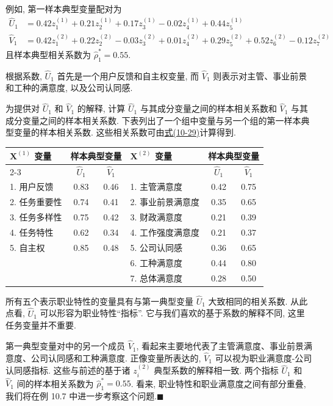 
例如, 第一样本典型变量配对为
\[
\begin{aligned}
\hat{U}_1&=0.42z_1^{(1)}+0.21z_2^{(1)}+0.17z_3^{(1)}-0.02z_4^{(1)}+0.44z_5^{(1)}\\
\hat{V}_1&=0.42z_1^{(2)}+0.22z_2^{(2)}-0.03z_3^{(2)}+0.01z_4^{(2)}+0.29z_5^{(2)}+0.52z_6^{(2)}-0.12z_7^{(2)}
\end{aligned}
\]
且样本典型相关系数为 $\hat{\rho}_1^*=0.55$.

根据系数, $\hat{U}_1$ 首先是一个用户反馈和自主权变量, 而 $\hat{V}_1$ 则表示对主管、事业前景和工种的满意度, 以及公司认同感.

为提供对 $\hat{U}_1$ 和 $\hat{V}_1$ 的解释, 计算 $\hat{U}_1$ 与其成分变量之间的样本相关系数和 $\hat{V}_1$ 与其成分变量之间的样本相关系数. 下表列出了一个组中变量与另一个组的第一样本典型变量的样本相关系数. 这些相关系数可由\hyperref[eq:10-29]{式(10-29)}计算得到.

\begin{mvtable}
\begin{tabular}{l|cc|l|cc}
\hline
\multirow{2}{*}{$\mathbf{X}^{(1)}$ 变量} & \multicolumn{2}{c|}{样本典型变量} & \multirow{2}{*}{$\mathbf{X}^{(2)}$ 变量} & \multicolumn{2}{c}{样本典型变量}\\
\cline{2-3}\cline{5-6}
& $\hat{U}_1$ & $\hat{V}_1$ & & $\hat{U}_1$ & $\hat{V}_1$\\
\hline
1. 用户反馈 & 0.83 & 0.46 & 1. 主管满意度 & 0.42 & 0.75\\
2. 任务重要性 & 0.74 & 0.41 & 2. 事业前景满意度 & 0.35 & 0.65\\
3. 任务多样性 & 0.75 & 0.42 & 3. 财政满意度 & 0.21 & 0.39\\
4. 任务特性 & 0.62 & 0.34 & 4. 工作强度满意度 & 0.21 & 0.37\\
5. 自主权 & 0.85 & 0.48 & 5. 公司认同感 & 0.36 & 0.65\\
& & & 6. 工种满意度 & 0.44 & 0.80\\
& & & 7. 总体满意度 & 0.28 & 0.50\\
\hline
\end{tabular}
\end{mvtable}

所有五个表示职业特性的变量具有与第一典型变量 $\hat{U}_1$ 大致相同的相关系数. 从此点看, $\hat{U}_1$ 可以形容为职业特性“指标”. 它与我们喜欢的基于系数的解释不同, 这里任务变量并不重要.

第一典型变量对中的另一个成员 $\hat{V}_1$, 看起来主要地代表了主管满意度、事业前景满意度、公司认同感和工种满意度. 正像变量所表达的, $\hat{V}_1$ 可以视为职业满意度-公司认同感指标. 这些与前述的基于诸 $z_i^{(2)}$ 典型系数的解释相一致. 两个指标 $\hat{U}_1$ 和 $\hat{V}_1$ 间的样本相关系数为 $\hat{\rho}_1^*=0.55$. 看来, 职业特性和职业满意度之间有部分重叠, 我们将在例 10.7 中进一步考察这个问题.\hfill$\blacksquare$

